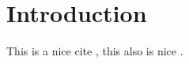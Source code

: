\chapter{Introduction}


This is a nice cite \citep{Barragan2016}, this also is nice \citet{Barragan2017}.
